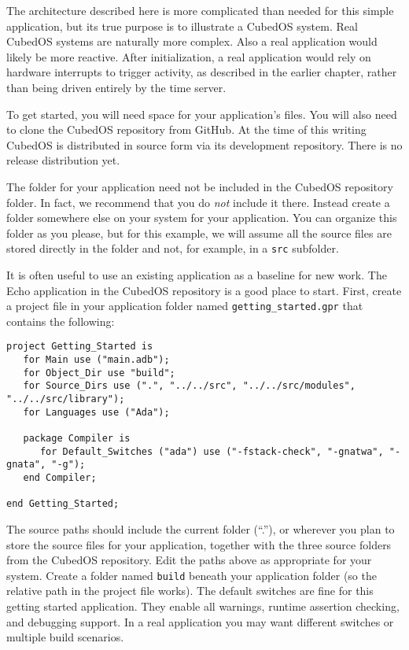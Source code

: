 \documentclass{scrreprt}
\begin{document}
The architecture described here is more complicated than needed for this simple application, but
its true purpose is to illustrate a CubedOS system. Real CubedOS systems are naturally more
complex. Also a real application would likely be more reactive. After initialization, a real
application would rely on hardware interrupts to trigger activity, as described in the earlier
chapter, rather than being driven entirely by the time server.

To get started, you will need space for your application's files. You will also need to clone
the CubedOS repository from GitHub. At the time of this writing CubedOS is distributed in source
form via its development repository. There is no release distribution yet.

The folder for your application need not be included in the CubedOS repository folder. In fact,
we recommend that you do \emph{not} include it there. Instead create a folder somewhere else on
your system for your application. You can organize this folder as you please, but for this
example, we will assume all the source files are stored directly in the folder and not, for
example, in a \texttt{src} subfolder.

It is often useful to use an existing application as a baseline for new work. The Echo
application in the CubedOS repository is a good place to start. First, create a project file in
your application folder named \texttt{getting\_started.gpr} that contains the following:
\begin{verbatim}
project Getting_Started is
   for Main use ("main.adb");
   for Object_Dir use "build";
   for Source_Dirs use (".", "../../src", "../../src/modules", "../../src/library");
   for Languages use ("Ada");

   package Compiler is
      for Default_Switches ("ada") use ("-fstack-check", "-gnatwa", "-gnata", "-g");
   end Compiler;

end Getting_Started;
\end{verbatim}

The source paths should include the current folder (``.''), or wherever you plan to store the
source files for your application, together with the three source folders from the CubedOS
repository. Edit the paths above as appropriate for your system. Create a folder named
\texttt{build} beneath your application folder (so the relative path in the project file works).
The default switches are fine for this getting started application. They enable all warnings,
runtime assertion checking, and debugging support. In a real application you may want different
switches or multiple build scenarios.
\end{document}
